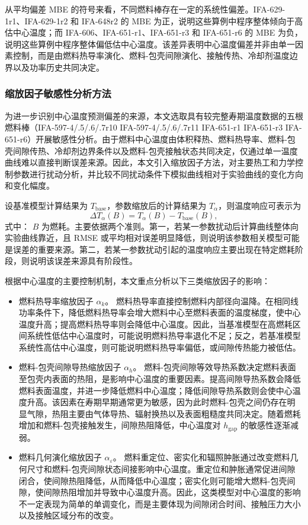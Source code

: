 从平均偏差 MBE 的符号来看，不同燃料棒存在一定的系统性偏差。IFA-629-1r1、IFA-629-1r2 和 IFA-648r2 的 MBE 为正，说明这些算例中程序整体倾向于高估中心温度；而 IFA-606、IFA-651-r1、IFA-651-r3 和 IFA-651-r6 的 MBE 为负，说明这些算例中程序整体偏低估中心温度。该差异表明中心温度偏差并非由单一因素控制，而是由燃料热导率演化、燃料-包壳间隙演化、接触传热、冷却剂温度边界以及功率历史共同决定。


\subsubsection{缩放因子敏感性分析方法}
为进一步识别中心温度预测偏差的来源，本文选取具有较完整寿期温度数据的五根燃料棒（IFA-597-4/.5/.6/.7r10 IFA-597-4/.5/.6/.7r11 IFA-651-r1 IFA-651-r3 IFA-651-r6）开展敏感性分析。由于燃料中心温度由体积释热、燃料热导率、燃料-包壳间隙传热、冷却剂边界条件以及燃料-包壳接触状态共同决定，仅通过单一温度曲线难以直接判断误差来源。因此，本文引入缩放因子方法，对主要热工和力学控制参数进行扰动分析，并比较不同扰动条件下模拟曲线相对于实验曲线的变化方向和变化幅度。

设基准模型计算结果为 \(T_\mathrm{base}\)，参数缩放后的计算结果为 \(T_\alpha\)，则温度响应可表示为
\[
\Delta T_\alpha(B)
=
T_\alpha(B)-T_\mathrm{base}(B),
\]
\noindent 式中： \(B\) 为燃耗。主要依据两个准则。第一，若某一参数扰动后计算曲线整体向实验曲线靠近，且 RMSE 或平均相对误差明显降低，则说明该参数相关模型可能是误差的重要来源。第二，若某一参数扰动引起的温度响应主要出现在特定燃耗阶段，则说明该误差来源具有阶段性。


根据中心温度的主要控制机制，本文重点分析以下三类缩放因子的影响：

\begin{itemize}
	\item 燃料热导率缩放因子 \(\alpha_k\)。
	燃料热导率直接控制燃料内部径向温降。在相同线功率条件下，降低燃料热导率会增大燃料中心至燃料表面的温度梯度，使中心温度升高；提高燃料热导率则会降低中心温度。因此，当基准模型在高燃耗区间系统性低估中心温度时，可能说明燃料热导率退化不足；反之，若基准模型系统性高估中心温度，则可能说明燃料热导率偏低，或间隙传热能力被低估。
	
	\item 燃料-包壳间隙导热缩放因子 \(\alpha_h\)。
	燃料-包壳间隙等效导热系数决定燃料表面至包壳内表面的热阻，是影响中心温度的重要因素。提高间隙导热系数会降低燃料表面温度，并进一步降低燃料中心温度；降低间隙导热系数则会使中心温度升高。该因素在寿期早期通常更为敏感，因为此时燃料-包壳之间仍存在明显气隙，热阻主要由气体导热、辐射换热以及表面粗糙度共同决定。随着燃耗增加和燃料-包壳接触发生，间隙热阻降低，中心温度对 \(h_\mathrm{gap}\) 的敏感性逐渐减弱。
	
	\item 燃料几何演化缩放因子 \(\alpha_\varepsilon\)。
	燃料重定位、密实化和辐照肿胀通过改变燃料几何尺寸和燃料-包壳间隙状态间接影响中心温度。重定位和肿胀通常促进间隙闭合，使间隙热阻降低，从而降低中心温度；密实化则可能增大燃料-包壳间隙，使间隙热阻增加并导致中心温度升高。因此，这类模型对中心温度的影响不一定表现为简单的单调变化，而是主要体现为间隙闭合时间、接触压力大小以及接触区域分布的改变。
\end{itemize}


